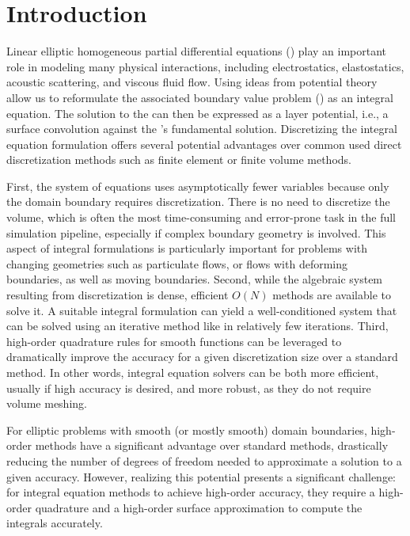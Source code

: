 \section{Introduction\label{sec:intro}}

Linear elliptic homogeneous partial differential equations (\pdes) play an important role in modeling many physical interactions, including
electrostatics, elastostatics, acoustic scattering, and viscous fluid flow.
Using ideas from potential theory allow us to reformulate the associated boundary value problem (\bvp) as an integral equation.
The solution to the \bvp can then be expressed as a layer potential, i.e., a surface convolution against the \pde's fundamental solution.
Discretizing the integral equation formulation offers several potential advantages over common used direct \pde discretization methods such as finite element or finite volume methods. 

First, the system of equations uses asymptotically fewer variables because only the domain boundary requires discretization.
There is no need to discretize the volume, which is often the most time-consuming
and error-prone task in the full simulation pipeline, especially if complex boundary geometry is involved.
This aspect of integral formulations is particularly important for problems with changing geometries such as particulate flows, or flows with deforming boundaries, as well as moving boundaries.
Second, while the algebraic system resulting from discretization is dense, efficient $O(N)$ methods are available to solve it.
A suitable integral formulation can yield a well-conditioned system that can be solved using an iterative method like \gmres in relatively few iterations.
Third, high-order quadrature rules for smooth functions can be leveraged to dramatically improve the accuracy for a given discretization size over a standard method.
In other words, integral equation solvers can be both more efficient, usually if high accuracy is desired, and more robust, as they do not require volume meshing.

For elliptic problems with smooth (or mostly smooth) domain boundaries, high-order methods have a significant advantage over standard methods, drastically reducing the number of degrees of freedom needed to approximate a solution to a given accuracy. 
However, realizing this potential presents a significant challenge: for integral equation methods to achieve high-order accuracy, they require a high-order quadrature and a high-order surface approximation to compute the integrals accurately.


